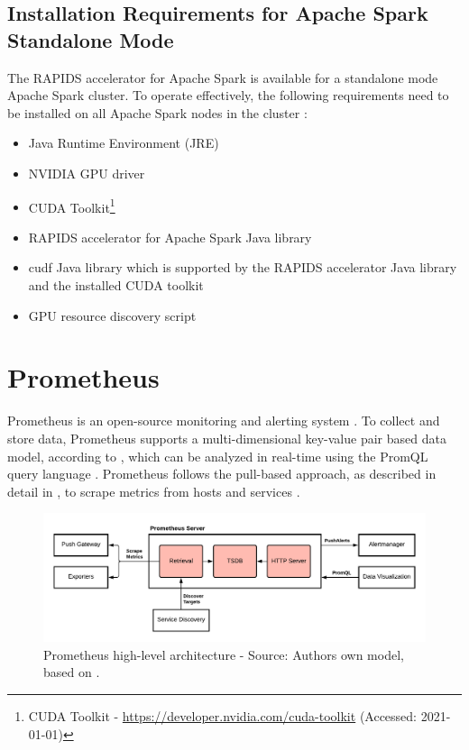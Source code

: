 \subsection{Installation Requirements for Apache Spark Standalone Mode}
\label{subsec:04_rapids_req}
The RAPIDS accelerator for Apache Spark is available for a standalone mode Apache Spark cluster. To operate effectively, the following requirements need to be installed on all Apache Spark nodes in the cluster \cite{SparkRapids2020Docs}:
\begin{itemize}
\item Java Runtime Environment (JRE)
\item NVIDIA GPU driver
\item CUDA Toolkit\footnote{CUDA Toolkit - \url{https://developer.nvidia.com/cuda-toolkit} (Accessed: 2021-01-01)}
\item RAPIDS accelerator for Apache Spark Java library
\item cudf Java library which is supported by the RAPIDS accelerator Java library and the installed CUDA toolkit
\item GPU resource discovery script
\end{itemize}


\section{Prometheus}
\label{sec:04_prom}
Prometheus is an open-source monitoring and alerting system \cite{Prom2020Docs}.
To collect and store data, Prometheus supports a multi-dimensional key-value pair based data model, according to , which can be analyzed in real-time using the PromQL query language \cite{Pandey2020Monitoring}.
Prometheus follows the pull-based approach, as described in detail in , to scrape metrics from hosts and services \cite{Bastos2019Prom}.


\begin{figure}[h]
\centering
\includegraphics[scale=0.62]{images/04_technical_background/prometheus/prometheus_architecture}
\caption{Prometheus high-level architecture - Source: Authors own model, based on \cite{Prom2020Docs, Bastos2019Prom}.}
\label{fig:prom_architecture}
\end{figure}


